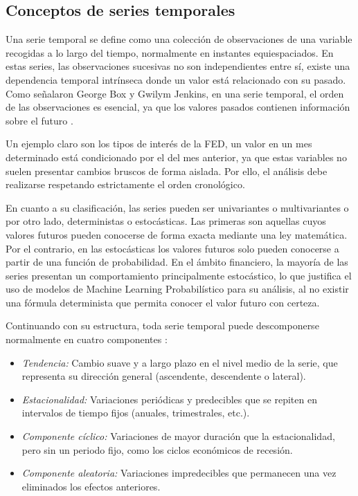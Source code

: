 \subsection{Conceptos de series temporales}
Una serie temporal se define como una colección de observaciones de una variable recogidas a lo largo del tiempo, normalmente en instantes equiespaciados. En estas series, las observaciones sucesivas no son independientes entre sí, existe una dependencia temporal intrínseca donde un valor está relacionado con su pasado. Como señalaron George Box y Gwilym Jenkins, en una serie temporal, el orden de las observaciones es esencial, ya que los valores pasados contienen información sobre el futuro \cite{box_jenkins1970}. 

Un ejemplo claro son los tipos de interés de la FED, un valor en un mes determinado está condicionado por el del mes anterior, ya que estas variables no suelen presentar cambios bruscos de forma aislada. Por ello, el análisis debe realizarse respetando estrictamente el orden cronológico.

En cuanto a su clasificación, las series pueden ser univariantes o multivariantes o por otro lado, deterministas o estocásticas. Las primeras son aquellas cuyos valores futuros pueden conocerse de forma exacta mediante una ley matemática. Por el contrario, en las estocásticas los valores futuros solo pueden conocerse a partir de una función de probabilidad. En el ámbito financiero, la mayoría de las series presentan un comportamiento principalmente estocástico, lo que justifica el uso de modelos de Machine Learning Probabilístico \cite{kepmur} para su análisis, al no existir una fórmula determinista que permita conocer el valor futuro con certeza.

Continuando con su estructura, toda serie temporal puede descomponerse normalmente en cuatro componentes \cite{componentes_series}:

\begin{itemize}
    \item \emph{Tendencia:} Cambio suave y a largo plazo en el nivel medio de la serie, que representa su dirección general (ascendente, descendente o lateral).
    \item \emph{Estacionalidad:} Variaciones periódicas y predecibles que se repiten en intervalos de tiempo fijos (anuales, trimestrales, etc.).
    \item \emph{Componente cíclico:} Variaciones de mayor duración que la estacionalidad, pero sin un periodo fijo, como los ciclos económicos de recesión.
    \item \emph{Componente aleatoria:} Variaciones impredecibles que permanecen una vez eliminados los efectos anteriores.
\end{itemize}

